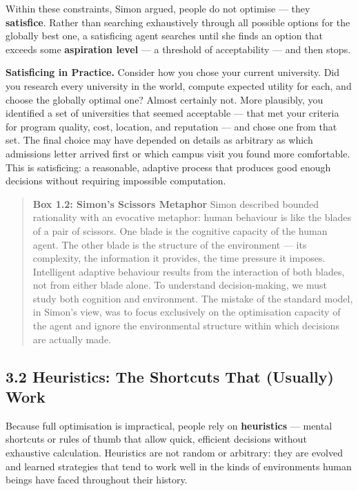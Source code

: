 \documentclass[12pt, letterpaper]{article}
\begin{document}
Within these constraints, Simon argued, people do not optimise --- they \textbf{satisfice}. Rather than searching exhaustively through all possible options for the globally best one, a satisficing agent searches until she finds an option that exceeds some \textbf{aspiration level} --- a threshold of acceptability --- and then stops.

\textbf{Satisficing in Practice.} Consider how you chose your current university. Did you research every university in the world, compute expected utility for each, and choose the globally optimal one? Almost certainly not. More plausibly, you identified a set of universities that seemed acceptable --- that met your criteria for program quality, cost, location, and reputation --- and chose one from that set. The final choice may have depended on details as arbitrary as which admissions letter arrived first or which campus visit you found more comfortable. This is satisficing: a reasonable, adaptive process that produces good enough decisions without requiring impossible computation.

\begin{quote}
\textbf{Box 1.2: Simon's Scissors Metaphor}
Simon described bounded rationality with an evocative metaphor: human behaviour is like the blades of a pair of scissors. One blade is the cognitive capacity of the human agent. The other blade is the structure of the environment --- its complexity, the information it provides, the time pressure it imposes. Intelligent adaptive behaviour results from the interaction of both blades, not from either blade alone. To understand decision-making, we must study both cognition and environment. The mistake of the standard model, in Simon's view, was to focus exclusively on the optimisation capacity of the agent and ignore the environmental structure within which decisions are actually made.
\end{quote}

\medskip


\subsection{3.2 Heuristics: The Shortcuts That (Usually) Work}


Because full optimisation is impractical, people rely on \textbf{heuristics} --- mental shortcuts or rules of thumb that allow quick, efficient decisions without exhaustive calculation. Heuristics are not random or arbitrary: they are evolved and learned strategies that tend to work well in the kinds of environments human beings have faced throughout their history.
\end{document}
